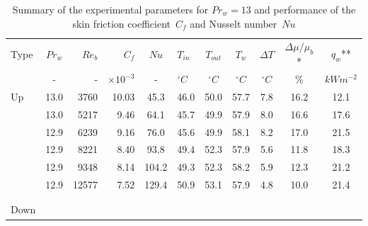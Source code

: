 \documentclass[12pt,oneside]{jbook}
\begin{document}
\begin{table}[h]
\centering
\caption{Summary of the experimental parameters for $Pr_{w}=13$ and performance of the skin friction coefficient\ $C_{f}$ and Nusselt number\ $Nu$}
\vspace{1zh}
\label{pr13_updown}
\begin{tabular}{lSrrSlSSSSS}
\toprule%
{Type} & {{$Pr_{w}$}} & {$Re_{b}$} & {$C_{f}$} & {$Nu$} & {$T_{in}$} & {$T_{out}$} &  {$T_{w}$} & {$\Delta T$}  & {$\Delta \mu/ \mu_{b}$*} & {$q_{w}$**} \\
{}&{-}&{-}&{$\times10^{-3}$}&{-}&{$^\circ C$}&{$^\circ C$}&{$^\circ C$}&{$^\circ C$}&{\%}&{$kWm^{-2}$}\\\midrule %
Up   & 13.0  & 3760  & 10.03  & 45.3 & 46.0 & 50.0 & 57.7 & 7.8  & 16.2  & 12.1\\
     & 13.0  & 5217  & 9.46   & 64.1 & 45.7 & 49.9 & 57.9 & 8.0  & 16.6  & 17.6\\
     & 12.9  & 6239  & 9.16   & 76.0 & 45.6 & 49.9 & 58.1 & 8.2  & 17.0  & 21.5\\
     & 12.9  & 8221  & 8.40   & 93.8 & 49.4 & 52.3 & 57.9 & 5.6  & 11.8  & 18.3\\
     & 12.9  & 9348  & 8.14   & 104.2& 49.3 & 52.3 & 58.2 & 5.9  & 12.3  & 21.2\\
     & 12.9  & 12577 & 7.52   & 129.4& 50.9 & 53.1 & 57.9 & 4.8  & 10.0  & 21.4\\
     &&&&&&&&&&\\
     &&&&&&&&&&\\
\midrule
Down &&&&&&&&&&\\
\bottomrule
\end{tabular}
\end{table}






\clearpage
\end{document}
